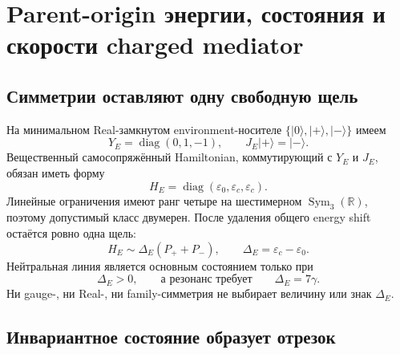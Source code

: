 \chapter{Parent-origin энергии, состояния и скорости charged mediator}
\label{ch:v8-charged-mediator-energy-state-rate-origin}

\section{Симметрии оставляют одну свободную щель}

На минимальном Real-замкнутом environment-носителе
$\{|0\rangle,|+\rangle,|-\rangle\}$ имеем
\begin{equation}
 Y_E=\operatorname{diag}(0,1,-1),
 \qquad J_E|+\rangle=|-\rangle.
 \label{eq:v8-mediator-origin-charge-real-data}
\end{equation}
Вещественный самосопряжённый Hamiltonian, коммутирующий с $Y_E$ и $J_E$,
обязан иметь форму
\begin{equation}
 H_E=\operatorname{diag}(\varepsilon_0,\varepsilon_c,\varepsilon_c).
 \label{eq:v8-mediator-origin-hamiltonian-class}
\end{equation}
Линейные ограничения имеют ранг четыре на шестимерном
$\operatorname{Sym}_3(\mathbb R)$, поэтому допустимый класс двумерен. После
удаления общего energy shift остаётся ровно одна щель:
\begin{equation}
 H_E\sim\Delta_E(P_++P_-),
 \qquad \Delta_E=\varepsilon_c-\varepsilon_0.
 \label{eq:v8-mediator-origin-essential-gap}
\end{equation}
Нейтральная линия является основным состоянием только при
\begin{equation}
 \Delta_E>0,
 \qquad\text{а резонанс требует}\qquad
 \Delta_E=7\gamma.
 \label{eq:v8-mediator-origin-ground-and-resonance}
\end{equation}
Ни gauge-, ни Real-, ни family-симметрия не выбирает величину или знак
$\Delta_E$.

\section{Инвариантное состояние образует отрезок}


